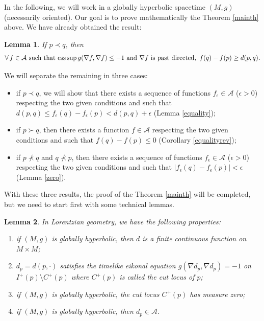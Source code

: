 \documentclass[11pt]{article}
\newtheorem{lemma}{Lemma}
\newcommand{\abs}[1]{\left\vert {#1} \right\vert}
\begin{document}
In the following, we will work in a globally hyperbolic spacetime $(M,g)$ (necessarily oriented). Our goal is to prove mathematically the Theorem \ref{mainth} above. We have already obtained the result:

\begin{lemma}\label{lemmainequa}
If $p \prec q$, then
\begin{gather*}
\forall \, f \in \mathcal A\text{ such that } \text{\rm ess} \sup g( \nabla f, \nabla f ) \leq -1   \text{ and }  \nabla f \text{ is past directed}, \  f(q)-f(p)   \geq  d(p,q).
\end{gather*}
\end{lemma}

We will separate the remaining in three cases:
\begin{itemize}\itemsep=0pt
\item if $p \prec q$, we will show that there exists a sequence of functions $f_\epsilon \in\mathcal A$ ($\epsilon > 0$) respecting the two given conditions and such that $d(p,q) \leq f_\epsilon(q) -f_\epsilon(p) < d(p,q) + \epsilon$ (Lemma \ref{equality});
\item if $p \succ q$, then there exists a function $f \in\mathcal A$ respecting the two given conditions and such that \mbox{$f(q)-f(p) \leq 0$} (Corollary \ref{equalityrev});
\item if $p \nprec q$ and $q \nprec p$, then there exists a sequence of functions $f_\epsilon \in\mathcal A$ ($\epsilon > 0$) respecting the two given conditions and such that $\abs{ f_\epsilon(q) -f_\epsilon(p) } < \epsilon$ (Lemma \ref{zero}).
\end{itemize}

With these three results, the proof of the Theorem \ref{mainth} will be completed, but we need to start f\/irst with some technical lemmas.

\begin{lemma}
In Lorentzian geometry, we have the following properties:
\begin{enumerate}\itemsep=0pt
\item if $(M,g)$ is globally hyperbolic, then $d$ is a finite continuous function on $M \times M$;

\item $d_p = d(p,\cdot) $ satisfies the timelike eikonal equation $g( \nabla d_p , \nabla d_p) = -1$ on $I^+(p) \setminus C^+(p)$ where $C^+(p)$ is called the cut locus of $p$;

\item if $(M,g)$ is globally hyperbolic, the cut locus  $C^+(p)$ has measure zero;

\item  if $(M,g)$ is globally hyperbolic, then $d_p\in\mathcal A$.
\end{enumerate}
\end{lemma}
\end{document}

